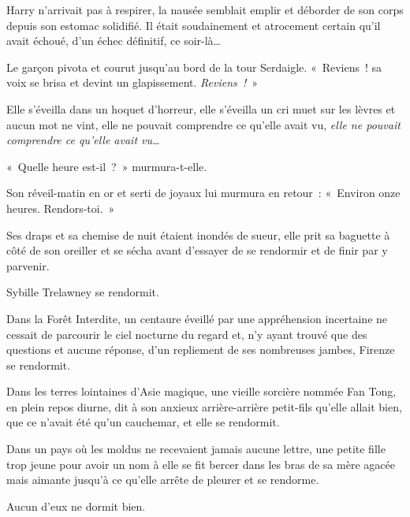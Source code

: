 Harry n'arrivait pas à respirer, la nausée semblait emplir et déborder de son corps depuis son estomac solidifié.
Il était soudainement et atrocement certain qu'il avait échoué, d'un échec définitif, ce soir-là…

Le garçon pivota et courut jusqu'au bord de la tour Serdaigle.
«~Reviens~! sa voix se brisa et devint un glapissement.
\emph{Reviens~!}~»


Elle s'éveilla dans un hoquet d'horreur, elle s'éveilla un cri muet sur les lèvres et aucun mot ne vint, elle ne pouvait comprendre ce qu'elle avait vu, \emph{elle ne pouvait comprendre ce qu'elle avait vu…}

«~Quelle heure est-il~?~»
murmura-t-elle.

Son réveil-matin en or et serti de joyaux lui murmura en retour~: «~Environ onze heures.
Rendors-toi.~»

Ses draps et sa chemise de nuit étaient inondés de sueur, elle prit sa baguette à côté de son oreiller et se sécha avant d'essayer de se rendormir et de finir par y parvenir.

Sybille Trelawney se rendormit.

Dans la Forêt Interdite, un centaure éveillé par une appréhension incertaine ne cessait de parcourir le ciel nocturne du regard et, n'y ayant trouvé que des questions et aucune réponse, d'un repliement de ses nombreuses jambes, Firenze se rendormit.

Dans les terres lointaines d'Asie magique, une vieille sorcière nommée Fan Tong, en plein repos diurne, dit à son anxieux arrière-arrière petit-fils qu'elle allait bien, que ce n'avait été qu'un cauchemar, et elle se rendormit.

Dans un pays où les moldus ne recevaient jamais aucune lettre, une petite fille trop jeune pour avoir un nom à elle se fit bercer dans les bras de sa mère agacée mais aimante jusqu'à ce qu'elle arrête de pleurer et se rendorme.

Aucun d'eux ne dormit bien.
